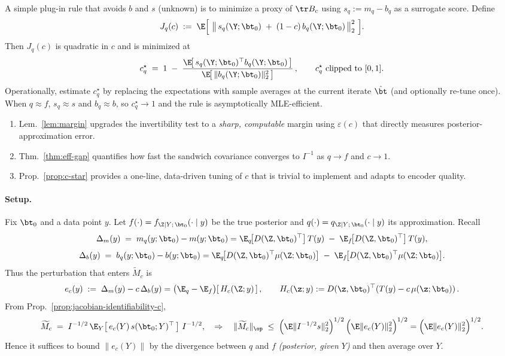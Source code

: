 \begin{proposition}
\label{prop:c-star}
A simple plug-in rule that avoids $b$ and $s$ (unknown) is to minimize a proxy of $\tr B_c$ using $s_q:=m_q-b_q$ as a surrogate score.
Define
\[
J_q(c)\;:=\;\E\Big[\ \big\|\, s_q(\Y;\bt_0)\;+\;(1-c)\,b_q(\Y;\bt_0)\,\big\|_2^2\ \Big].
\]
Then $J_q(c)$ is quadratic in $c$ and is minimized at
\[
c_q^\star\;=\;1\;-\;\frac{\E\!\big[\,s_q(\Y;\bt_0)^\top b_q(\Y;\bt_0)\,\big]}{\E\!\big[\,\|b_q(\Y;\bt_0)\|_2^2\,\big]}\,,
\qquad c_q^\star\ \text{clipped to }[0,1].
\]
Operationally, estimate $c_q^\star$ by replacing the expectations with sample averages at the current iterate $\hat\bt$ (and optionally re-tune once).
When $q\!\approx\! f$, $s_q\!\approx\! s$ and $b_q\!\approx\! b$, so $c_q^\star\!\to\!1$ and the rule is asymptotically MLE-efficient.
\end{proposition}

\begin{remark}
\leavevmode
\vspace{-0.5em}
\begin{enumerate}
\item Lem.~\ref{lem:margin} upgrades the invertibility test to a \emph{sharp, computable} margin using $\varepsilon(c)$ that directly measures posterior-approximation error.
\item Thm.~\ref{thm:eff-gap} quantifies how fast the sandwich covariance converges to $I^{-1}$ as $q\!\to\! f$ and $c\!\to\!1$.
\item Prop.~\ref{prop:c-star} provides a one-line, data-driven tuning of $c$ that is trivial to implement and adapts to encoder quality.
\end{enumerate}
\end{remark}

\paragraph{Setup.}
Fix $\bt_0$ and a data point $y$. Let $f(\cdot)=f_{\Z\mid Y;\,\bt_0}(\cdot\mid y)$ be the true posterior
and $q(\cdot)=q_{\Z\mid Y;\,\bt_0}(\cdot\mid y)$ its approximation.
Recall
\[
\Delta_m(y) \;=\; m_q(y;\bt_0)-m(y;\bt_0)
= \E_q\!\big[D(\Z,\bt_0)^\top\big]\,T(y)\;-\;\E_f\!\big[D(\Z,\bt_0)^\top\big]\,T(y),
\]
\[
\Delta_b(y) \;=\; b_q(y;\bt_0)-b(y;\bt_0)
= \E_q\!\big[D(\Z,\bt_0)^\top \mu(\Z;\bt_0)\big]\;-\;\E_f\!\big[D(\Z,\bt_0)^\top \mu(\Z;\bt_0)\big].
\]
Thus the perturbation that enters $\widetilde M_c$ is
\[
e_c(y) \;:=\; \Delta_m(y) - c\,\Delta_b(y)
= \big(\E_q-\E_f\big)\!\left[\,H_c(\Z;y)\,\right],\qquad 
H_c(\z;y):= D(\z,\bt_0)^\top\!\left(T(y)-c\,\mu(\z;\bt_0)\right).
\]
From Prop.~\textup{\ref{prop:jacobian-identifiability-c}}, 
\[
\widetilde M_c \;=\; I^{-1/2}\,\E_Y\!\left[\,e_c(Y)\,s(\bt_0;Y)^\top\,\right]\,I^{-1/2},
\quad\Rightarrow\quad
\|\widetilde M_c\|_{\op} \;\le\; \Big(\E\|I^{-1/2}s\|_2^2\Big)^{1/2}\,\Big(\E\|e_c(Y)\|_2^2\Big)^{1/2}
= \Big(\E\|e_c(Y)\|_2^2\Big)^{1/2}.
\]
Hence it suffices to bound $\|e_c(Y)\|$ by the divergence between $q$ and $f$ \emph{(posterior, given $Y$)} and then average over $Y$.
\medskip


